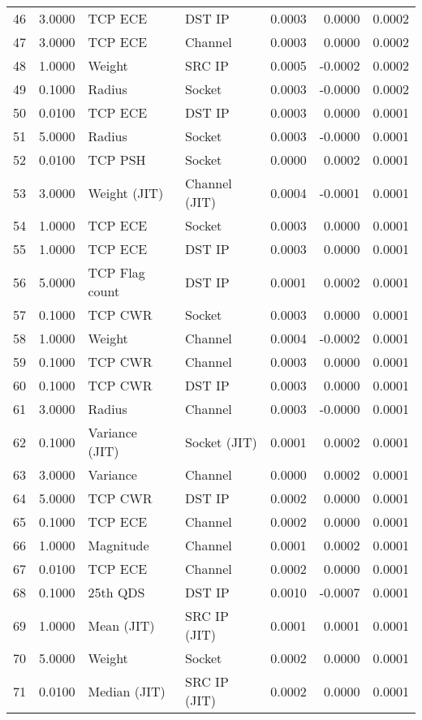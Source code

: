 \begin{longtable}{lrllrrr}
46 & 3.0000 & TCP ECE & DST IP & 0.0003 & 0.0000 & 0.0002 \\
47 & 3.0000 & TCP ECE & Channel & 0.0003 & 0.0000 & 0.0002 \\
48 & 1.0000 & Weight & SRC IP & 0.0005 & -0.0002 & 0.0002 \\
49 & 0.1000 & Radius & Socket & 0.0003 & -0.0000 & 0.0002 \\
50 & 0.0100 & TCP ECE & DST IP & 0.0003 & 0.0000 & 0.0001 \\
51 & 5.0000 & Radius & Socket & 0.0003 & -0.0000 & 0.0001 \\
52 & 0.0100 & TCP PSH & Socket & 0.0000 & 0.0002 & 0.0001 \\
53 & 3.0000 & Weight (JIT) & Channel (JIT) & 0.0004 & -0.0001 & 0.0001 \\
54 & 1.0000 & TCP ECE & Socket & 0.0003 & 0.0000 & 0.0001 \\
55 & 1.0000 & TCP ECE & DST IP & 0.0003 & 0.0000 & 0.0001 \\
56 & 5.0000 & TCP Flag count & DST IP & 0.0001 & 0.0002 & 0.0001 \\
57 & 0.1000 & TCP CWR & Socket & 0.0003 & 0.0000 & 0.0001 \\
58 & 1.0000 & Weight & Channel & 0.0004 & -0.0002 & 0.0001 \\
59 & 0.1000 & TCP CWR & Channel & 0.0003 & 0.0000 & 0.0001 \\
60 & 0.1000 & TCP CWR & DST IP & 0.0003 & 0.0000 & 0.0001 \\
61 & 3.0000 & Radius & Channel & 0.0003 & -0.0000 & 0.0001 \\
62 & 0.1000 & Variance (JIT) & Socket (JIT) & 0.0001 & 0.0002 & 0.0001 \\
63 & 3.0000 & Variance & Channel & 0.0000 & 0.0002 & 0.0001 \\
64 & 5.0000 & TCP CWR & DST IP & 0.0002 & 0.0000 & 0.0001 \\
65 & 0.1000 & TCP ECE & Channel & 0.0002 & 0.0000 & 0.0001 \\
66 & 1.0000 & Magnitude & Channel & 0.0001 & 0.0002 & 0.0001 \\
67 & 0.0100 & TCP ECE & Channel & 0.0002 & 0.0000 & 0.0001 \\
68 & 0.1000 & 25th QDS & DST IP & 0.0010 & -0.0007 & 0.0001 \\
69 & 1.0000 & Mean (JIT) & SRC IP (JIT) & 0.0001 & 0.0001 & 0.0001 \\
70 & 5.0000 & Weight & Socket & 0.0002 & 0.0000 & 0.0001 \\
71 & 0.0100 & Median (JIT) & SRC IP (JIT) & 0.0002 & 0.0000 & 0.0001 \\

\end{longtable}
